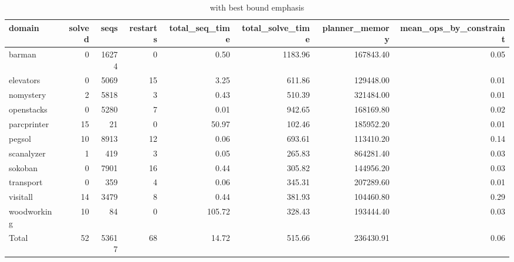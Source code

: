 \begin{table*}[htbp]
\centering
\begingroup\small
\begin{tabular}{lrrrrrrr}
  \hline
domain & solved & seqs & restarts & total\_seq\_time & total\_solve\_time & planner\_memory & mean\_ops\_by\_constraint \\ 
  \hline
barman &   0 & 16274 &   0 & 0.50 & 1183.96 & 167843.40 & 0.05 \\ 
  elevators &   0 & 5069 &  15 & 3.25 & 611.86 & 129448.00 & 0.01 \\ 
  nomystery &   2 & 5818 &   3 & 0.43 & 510.39 & 321484.00 & 0.01 \\ 
  openstacks &   0 & 5280 &   7 & 0.01 & 942.65 & 168169.80 & 0.02 \\ 
  parcprinter &  15 &  21 &   0 & 50.97 & 102.46 & 185952.20 & 0.01 \\ 
  pegsol &  10 & 8913 &  12 & 0.06 & 693.61 & 113410.20 & 0.14 \\ 
  scanalyzer &   1 & 419 &   3 & 0.05 & 265.83 & 864281.40 & 0.03 \\ 
  sokoban &   0 & 7901 &  16 & 0.44 & 305.82 & 144956.20 & 0.03 \\ 
  transport &   0 & 359 &   4 & 0.06 & 345.31 & 207289.60 & 0.01 \\ 
  visitall &  14 & 3479 &   8 & 0.44 & 381.93 & 104460.80 & 0.29 \\ 
  woodworking &  10 &  84 &   0 & 105.72 & 328.43 & 193444.40 & 0.03 \\ 
  Total &  52 & 53617 &  68 & 14.72 & 515.66 & 236430.91 & 0.06 \\ 
   \hline
\end{tabular}
\endgroup
\caption{\oursolver{} with best bound emphasis} 
\label{tab:best_bound_our}
\end{table*}
